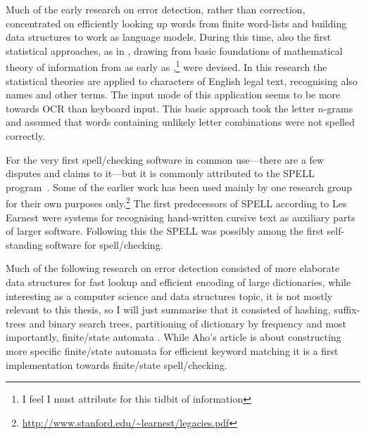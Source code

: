 \documentclass[officiallayout,final]{unihelcompling}
\begin{document}
Much of the early research on error detection, rather than correction,
concentrated on efficiently looking up words from finite word-lists and
building data structures to work as \glspl{language model}. During this time,
also the first statistical approaches, as in \citet{raviv1967decision}, drawing
from basic foundations of mathematical theory of information from as early as
\citet{shannon1948mathematical},\footnote{I feel I must attribute
\citet{liberman2012noisily} for this tidbit of information} were devised. In
this research the statistical theories are applied to characters of English
legal text, recognising also names and other terms. The input mode of this
application seems to be more towards OCR than keyboard input. This basic
approach took the letter \(n\)-grams and assumed that words containing unlikely
letter combinations were not spelled correctly.

For the very first spell\-/checking software in common use---there are a few
disputes and claims to it---but it is commonly attributed to the SPELL
program~\citep{gorin1971spell}.  Some of the earlier work has been used mainly
by one research group for their own purposes
only.\footnote{\url{http://www.stanford.edu/~learnest/legacies.pdf}} The first
predecessors of SPELL according to Les Earnest were systems for recognising
hand-written cursive text as auxiliary parts of larger software. Following this
the SPELL was possibly among the first self-standing software for
spell\-/checking.


Much of the following research on error detection consisted of more elaborate
data structures for fast lookup and efficient encoding of large dictionaries,
while interesting as a computer science and data structures topic, it is not
mostly relevant to this thesis, so I will just summarise that it consisted of
hashing, suffix-trees and binary search trees, partitioning of dictionary by
frequency \citep{knuth1973art} and most importantly, finite\-/state automata
\citep{aho1975efficient}. While Aho's article is about constructing more
specific finite\-/state automata for efficient keyword matching it is a first
implementation towards finite\-/state spell\-/checking.
\end{document}
